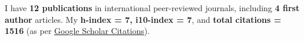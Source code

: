
I have \textbf{12 publications} in international peer-reviewed journals, including \textbf{4 first author} articles. My \textbf{h-index = 7, i10-index = 7}, and \textbf{total citations = 1516} (as per \href{https://scholar.google.com/citations?hl=en&user=6-7FYjIAAAAJ&authuser=2}{Google Scholar Citations}).

\nocite{*}


\printbibliography[heading={none},title={Journal Articles},type=article]



